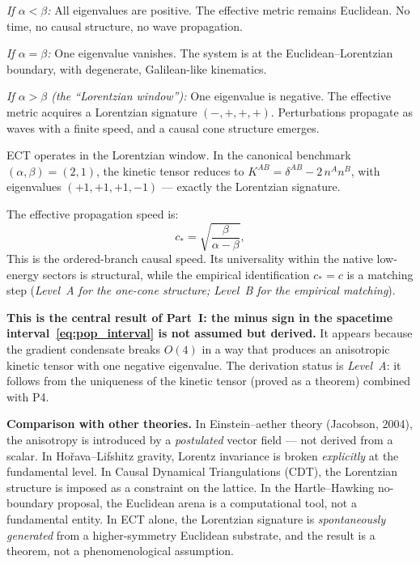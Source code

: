 \documentclass[11pt,a4paper]{article}
\begin{document}
\emph{If $\alpha < \beta$:} All eigenvalues are positive. The effective metric remains Euclidean. No time, no causal structure, no wave propagation.

\emph{If $\alpha = \beta$:} One eigenvalue vanishes. The system is at the Euclidean--Lorentzian boundary, with degenerate, Galilean-like kinematics.

\emph{If $\alpha > \beta$ (the ``Lorentzian window''):} One eigenvalue is negative. The effective metric acquires a Lorentzian signature $(-,+,+,+)$. Perturbations propagate as waves with a finite speed, and a causal cone structure emerges.

ECT operates in the Lorentzian window. In the canonical benchmark $(\alpha, \beta) = (2, 1)$, the kinetic tensor reduces to $K^{AB} = \delta^{AB} - 2\,n^An^B$, with eigenvalues $(+1, +1, +1, -1)$ --- exactly the Lorentzian signature.

The effective propagation speed is:
\begin{equation}
  c_* = \sqrt{\frac{\beta}{\alpha - \beta}},
  \label{eq:pop_cstar}
\end{equation}
This is the ordered-branch causal speed. Its universality within the native low-energy sectors is structural, while the empirical identification $c_*=c$ is a matching step (\emph{Level~A for the one-cone structure; Level~B for the empirical matching}).

\textbf{This is the central result of Part~I: the minus sign in the spacetime interval~\eqref{eq:pop_interval} is not assumed but derived.} It appears because the gradient condensate breaks $O(4)$ in a way that produces an anisotropic kinetic tensor with one negative eigenvalue. The derivation status is \emph{Level~A}: it follows from the uniqueness of the kinetic tensor (proved as a theorem) combined with P4.

\textbf{Comparison with other theories.} In Einstein--aether theory (Jacobson, 2004), the anisotropy is introduced by a \emph{postulated} vector field --- not derived from a scalar. In Ho\v{r}ava--Lifshitz gravity, Lorentz invariance is broken \emph{explicitly} at the fundamental level. In Causal Dynamical Triangulations (CDT), the Lorentzian structure is imposed as a constraint on the lattice. In the Hartle--Hawking no-boundary proposal, the Euclidean arena is a computational tool, not a fundamental entity. In ECT alone, the Lorentzian signature is \emph{spontaneously generated} from a higher-symmetry Euclidean substrate, and the result is a theorem, not a phenomenological assumption.
\end{document}

